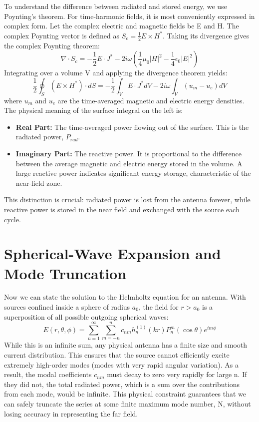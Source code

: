 \documentclass[11pt,a4paper]{article}
\begin{document}
To understand the difference between radiated and stored energy, we use Poynting's theorem. For time-harmonic fields, it is most conveniently expressed in complex form.
Let the complex electric and magnetic fields be E and H. The complex Poynting vector is defined as \(S_{c}=\frac{1}{2}E\times H^{*}\). Taking its divergence gives the complex Poynting theorem:
\begin{equation}
    \nabla\cdot S_{c}=-\frac{1}{2}E\cdot J^{*}-2i\omega\left(\frac{1}{4}\mu_{0}|H|^{2}-\frac{1}{4}\epsilon_{0}|E|^{2}\right)
\end{equation}
Integrating over a volume V and applying the divergence theorem yields:
\begin{equation}
    \frac{1}{2}\oint_{S}(E\times H^{*})\cdot dS=-\frac{1}{2}\int_{V}E\cdot J^{*}dV-2i\omega\int_{V}(u_{m}-u_{e})dV
\end{equation}
where \(u_{m}\) and \(u_{e}\) are the time-averaged magnetic and electric energy densities. The physical meaning of the surface integral on the left is:
\begin{itemize}
    \item \textbf{Real Part:} The time-averaged power flowing out of the surface. This is the radiated power, \(P_{rad}\).
    \item \textbf{Imaginary Part:} The reactive power. It is proportional to the difference between the average magnetic and electric energy stored in the volume. A large reactive power indicates significant energy storage, characteristic of the near-field zone.
\end{itemize}
This distinction is crucial: radiated power is lost from the antenna forever, while reactive power is stored in the near field and exchanged with the source each cycle.

\section{Spherical-Wave Expansion and Mode Truncation}

Now we can state the solution to the Helmholtz equation for an antenna. With sources confined inside a sphere of radius \(a_{0}\), the field for \(r>a_{0}\) is a superposition of all possible outgoing spherical waves:
\begin{equation}
    E(r,\theta,\phi)=\sum_{n=1}^{\infty}\sum_{m=-n}^{n}c_{nm}h_{n}^{(1)}(kr)P_{n}^{m}(\cos\theta)e^{im\phi}
\end{equation}
While this is an infinite sum, any physical antenna has a finite size and smooth current distribution. This ensures that the source cannot efficiently excite extremely high-order modes (modes with very rapid angular variation). As a result, the modal coefficients \(c_{nm}\) must decay to zero very rapidly for large n. If they did not, the total radiated power, which is a sum over the contributions from each mode, would be infinite. This physical constraint guarantees that we can safely truncate the series at some finite maximum mode number, N, without losing accuracy in representing the far field.
\end{document}
